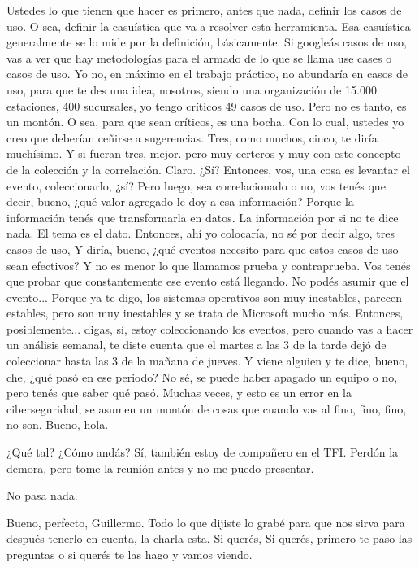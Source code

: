 \begin{description}[leftmargin=0cm, labelsep=0.5cm]
    \item[\textbf{PITA GUILLERMO:}] Ustedes lo que tienen que hacer es primero, antes que nada, definir los casos de uso. O sea, definir la casuística que va a resolver esta herramienta. Esa casuística generalmente se lo mide por la definición, básicamente. Si googleás casos de uso, vas a ver que hay metodologías para el armado de lo que se llama use cases o casos de uso. Yo no, en máximo en el trabajo práctico, no abundaría en casos de uso, para que te des una idea, nosotros, siendo una organización de 15.000 estaciones, 400 sucursales, yo tengo críticos 49 casos de uso. Pero no es tanto, es un montón. O sea, para que sean críticos, es una bocha. Con lo cual, ustedes yo creo que deberían ceñirse a sugerencias. Tres, como muchos, cinco, te diría muchísimo. Y si fueran tres, mejor. pero muy certeros y muy con este concepto de la colección y la correlación. Claro. ¿Sí? Entonces, vos, una cosa es levantar el evento, coleccionarlo, ¿sí? Pero luego, sea correlacionado o no, vos tenés que decir, bueno, ¿qué valor agregado le doy a esa información? Porque la información tenés que transformarla en datos. La información por si no te dice nada. El tema es el dato. Entonces, ahí yo colocaría, no sé por decir algo, tres casos de uso, Y diría, bueno, ¿qué eventos necesito para que estos casos de uso sean efectivos? Y no es menor lo que llamamos prueba y contraprueba. Vos tenés que probar que constantemente ese evento está llegando. No podés asumir que el evento... Porque ya te digo, los sistemas operativos son muy inestables, parecen estables, pero son muy inestables y se trata de Microsoft mucho más. Entonces, posiblemente... digas, sí, estoy coleccionando los eventos, pero cuando vas a hacer un análisis semanal, te diste cuenta que el martes a las 3 de la tarde dejó de coleccionar hasta las 3 de la mañana de jueves. Y viene alguien y te dice, bueno, che, ¿qué pasó en ese periodo? No sé, se puede haber apagado un equipo o no, pero tenés que saber qué pasó. Muchas veces, y esto es un error en la ciberseguridad, se asumen un montón de cosas que cuando vas al fino, fino, fino, no son. Bueno, hola.

    \item[\textbf{MOCIULSKY SANTIAGO:}] ¿Qué tal? ¿Cómo andás? Sí, también estoy de compañero en el TFI. Perdón la demora, pero tome la reunión antes y no me puedo presentar.

    \item[\textbf{PITA GUILLERMO:}] No pasa nada.

    \item[\textbf{MUNTAABSKI FEDERICO:}] Bueno, perfecto, Guillermo. Todo lo que dijiste lo grabé para que nos sirva para después tenerlo en cuenta, la charla esta. Si querés, Si querés, primero te paso las preguntas o si querés te las hago y vamos viendo.


\end{description}
